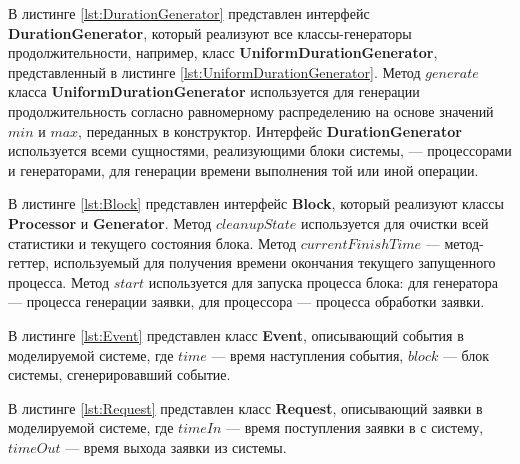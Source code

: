 В листинге \ref{lst:DurationGenerator} представлен интерфейс \textbf{DurationGenerator}, который реализуют все классы-генераторы продолжительности, например, класс \textbf{UniformDurationGenerator}, представленный в листинге \ref{lst:UniformDurationGenerator}. Метод $generate$ класса \textbf{UniformDurationGenerator} используется для генерации продолжительность согласно равномерному распределению на основе значений $min$ и $max$, переданных в конструктор. Интерфейс \textbf{DurationGenerator} используется всеми сущностями, реализующими блоки системы, --- процессорами и генераторами, для генерации времени выполнения той или иной операции.
\clearpage
{}

В листинге \ref{lst:Block} представлен интерфейс \textbf{Block}, который реализуют классы \textbf{Processor} и \textbf{Generator}. Метод $cleanupState$ используется для очистки всей статистики и текущего состояния блока. Метод $currentFinishTime$ --- метод-геттер, используемый для получения времени окончания текущего запущенного процесса. Метод $start$ используется для запуска процесса блока: для генератора --- процесса генерации заявки, для процессора --- процесса обработки заявки.
\clearpage
{}


В листинге \ref{lst:Event} представлен класс \textbf{Event}, описывающий события в моделируемой системе, где $time$ --- время наступления события, $block$ --- блок системы, сгенерировавший событие.


В листинге \ref{lst:Request} представлен класс \textbf{Request}, описывающий заявки в моделируемой системе, где $timeIn$ --- время поступления заявки в с систему, $timeOut$ --- время выхода заявки из системы.


